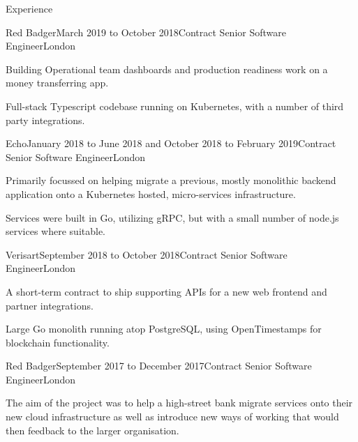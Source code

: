 \documentclass{resume} %
\begin{document}

\begin{rSection}{Experience}

  \begin{rExperience}{Red Badger}{March 2019 to October 2018}{Contract Senior Software Engineer}{London}
  \item Building Operational team dashboards and production readiness work on a money transferring app.
  \item Full-stack Typescript codebase running on Kubernetes, with a number of third party integrations.
  \end{rExperience}


  \begin{rExperience}{Echo}{January 2018 to June 2018 and October 2018 to February 2019}{Contract Senior Software Engineer}{London}
  \item Primarily focussed on helping migrate a previous, mostly monolithic backend application onto a Kubernetes hosted, micro-services infrastructure.
  \item Services were built in Go, utilizing gRPC, but with a small number of node.js services where suitable.
  \end{rExperience}


  \begin{rExperience}{Verisart}{September 2018 to October 2018}{Contract Senior Software Engineer}{London}
  \item A short-term contract to ship supporting APIs for a new web frontend and partner integrations.
  \item Large Go monolith running atop PostgreSQL, using OpenTimestamps for blockchain functionality.
  \end{rExperience}


  \begin{rExperience}{Red Badger}{September 2017 to December 2017}{Contract Senior Software Engineer}{London}
  \item The aim of the project was to help a high-street bank migrate services onto their new cloud infrastructure as well as introduce new ways of working that would then feedback to the larger organisation.
  \end{rExperience}


\end{rSection}
\end{document}
